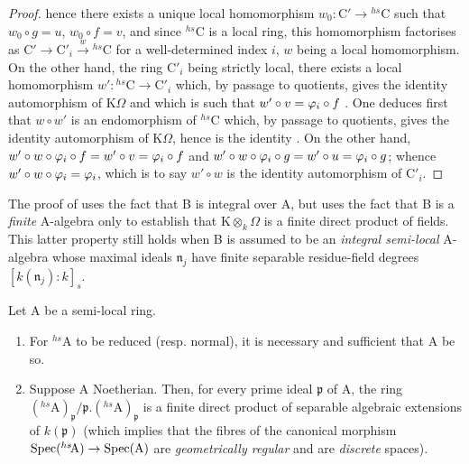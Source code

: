 \begin{proof}
hence there exists a unique local homomorphism $w_0:\mathrm{C}'\to{}^{hs}\!\mathrm{C}$ such that $w_0\circ g=u$, $w_0\circ f=v$, and since ${}^{hs}\!\mathrm{C}$ is a local ring, this homomorphism factorises as $\mathrm{C}'\to\mathrm{C}'_i\xrightarrow{w}{}^{hs}\!\mathrm{C}$ for a well-determined index $i$, $w$ being a local homomorphism.
On the other hand, the ring $\mathrm{C}'_i$ being strictly local, there exists a local homomorphism $w':{}^{hs}\!\mathrm{C}\to\mathrm{C}'_i$ which, by passage to quotients, gives the identity automorphism of $\mathrm{K}\Omega$ and which is such that $w'\circ v=\varphi_i\circ f$ .
One deduces first that $w\circ w'$ is an endomorphism of ${}^{hs}\!\mathrm{C}$ which, by passage to quotients, gives the identity automorphism of $\mathrm{K}\Omega$, hence
is the identity .
On the other hand, $w'\circ w\circ\varphi_i\circ f=w'\circ v=\varphi_i\circ f$ and $w'\circ w\circ\varphi_i\circ g=w'\circ u=\varphi_i\circ g$;
whence $w'\circ w\circ\varphi_i=\varphi_i$, which is to say $w'\circ w$ is the identity automorphism of $\mathrm{C}'_i$.
\end{proof}

\begin{remark}[18.8.11]
\label{IV.18.8.11}
The proof of  uses the fact that B is integral over A, but uses the fact that B is a \emph{finite} A-algebra only to establish that $\mathrm{K}\otimes_k\Omega$ is a finite direct product of fields.
This latter property still holds when B is assumed to be an \emph{integral semi-local} A-algebra whose maximal ideals $\mathfrak{n}_j$ have finite separable residue-field degrees $[k(\mathfrak{n}_j):k]_s$.
\end{remark}

\begin{proposition}[18.8.12]
\label{IV.18.8.12}
Let $\mathrm{A}$ be a semi-local ring.
\begin{enumerate}[label=\emph{\roman*)}]
  \item For ${}^{hs}\!\mathrm{A}$ to be reduced (resp. normal), it is necessary and sufficient that A be so.
  \item Suppose A Noetherian.
  Then, for every prime ideal $\mathfrak{p}$ of A, the ring $({}^{hs}\!\mathrm{A})_{\mathfrak{p}}/\mathfrak{p}.({}^{hs}\!\mathrm{A})_{\mathfrak{p}}$ is a finite direct product of separable algebraic extensions of $k(\mathfrak{p})$ (which implies that the fibres of the canonical morphism $\operatorname{Spec}({}^{hs}\!\mathrm{A})\to\operatorname{Spec}(\mathrm{A})$ are \emph{geometrically regular} and are \emph{discrete} spaces).
\end{enumerate}
\end{proposition}

